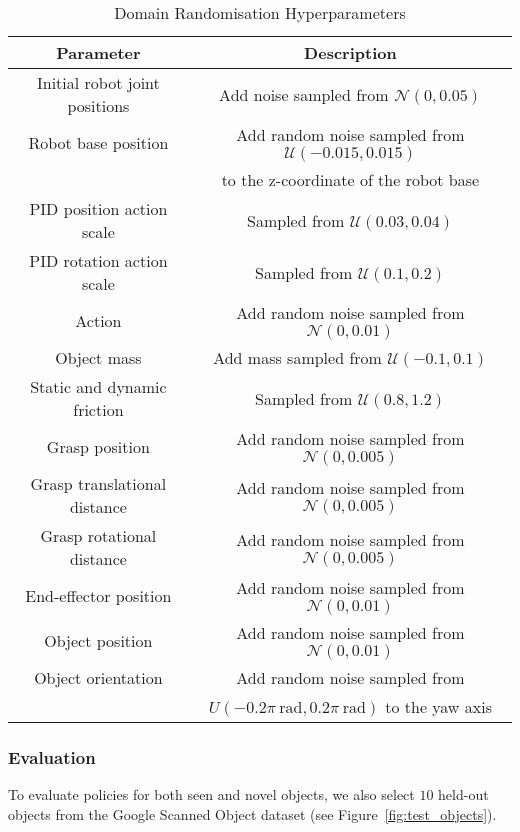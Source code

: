 \begin{table}[h]
\centering
\caption{Domain Randomisation Hyperparameters}
\vspace{0.5em}
\begin{tabular}{c|c} 
 \toprule
 Parameter  & Description  \\ 
 \midrule
 \midrule

 Initial robot joint positions & Add noise sampled from $\mathcal{N}(0, 0.05)$  \\
 Robot base position & Add random noise sampled from $\mathcal{U}(-0.015, 0.015)$ \\
 & to the z-coordinate of the robot base \\
 PID position action scale & Sampled from $\mathcal{U}(0.03, 0.04)$ \\
 PID rotation action scale & Sampled from $\mathcal{U}(0.1, 0.2)$ \\
 Action & Add random noise sampled from $\mathcal{N}(0, 0.01)$ \\
 Object mass & Add mass sampled from $\mathcal{U}(-0.1, 0.1)$ \\
 Static and dynamic friction & Sampled from $\mathcal{U}(0.8, 1.2)$ \\
 Grasp position & Add random noise sampled from $\mathcal{N}(0, 0.005)$ \\
 Grasp translational distance & Add random noise sampled from $\mathcal{N}(0, 0.005)$ \\
 Grasp rotational distance & Add random noise sampled from $\mathcal{N}(0, 0.005)$ \\
 End-effector position & Add random noise sampled from $\mathcal{N}(0, 0.01)$ \\
 Object position & Add random noise sampled from $\mathcal{N}(0, 0.01)$ \\
 Object orientation & Add random noise sampled from \\
 & $U(-0.2\pi\: \text{rad}, 0.2\pi\: \text{rad})$ to the yaw axis \\
 \bottomrule
\end{tabular}
\label{table:domain_randomisation}
\end{table}

\subsubsection{Evaluation}
To evaluate policies for both seen and novel objects, we also select $10$ held-out objects from the Google Scanned Object dataset (see Figure~\ref{fig:test_objects}).


